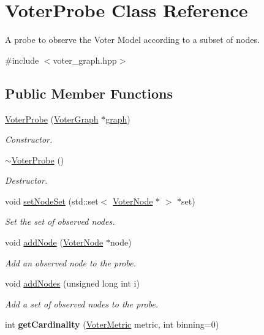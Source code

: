 \hypertarget{class_voter_probe}{\section{Voter\-Probe Class Reference}
\label{class_voter_probe}
}


A probe to observe the Voter Model according to a subset of nodes.  




{\ttfamily \#include $<$voter\-\_\-graph.\-hpp$>$}

\subsection*{Public Member Functions}
\begin{DoxyCompactItemize}
\item 
\hyperlink{class_voter_probe_a589eba6cb211385f334b2cad33c7b591}{Voter\-Probe} (\hyperlink{class_voter_graph}{Voter\-Graph} $\ast$\hyperlink{class_voter_probe_add099ac2ac20a5f6a0e3616e78639497}{graph})
\begin{DoxyCompactList}\small\item\em Constructor. \end{DoxyCompactList}\item 
\hypertarget{class_voter_probe_a13ddd0051f730aa8c5b4c1487ace3e16}{\hyperlink{class_voter_probe_a13ddd0051f730aa8c5b4c1487ace3e16}{$\sim$\-Voter\-Probe} ()}\label{class_voter_probe_a13ddd0051f730aa8c5b4c1487ace3e16}

\begin{DoxyCompactList}\small\item\em Destructor. \end{DoxyCompactList}\item 
void \hyperlink{class_voter_probe_a8d30841b343e791216084d6dd0f0f461}{set\-Node\-Set} (std\-::set$<$ \hyperlink{class_voter_node}{Voter\-Node} $\ast$ $>$ $\ast$set)
\begin{DoxyCompactList}\small\item\em Set the set of observed nodes. \end{DoxyCompactList}\item 
void \hyperlink{class_voter_probe_a102e61e3d43b00622f56e746b50aadcb}{add\-Node} (\hyperlink{class_voter_node}{Voter\-Node} $\ast$node)
\begin{DoxyCompactList}\small\item\em Add an observed node to the probe. \end{DoxyCompactList}\item 
void \hyperlink{class_voter_probe_a3833f42ffe18c150a127b2c98ff742fe}{add\-Nodes} (unsigned long int i)
\begin{DoxyCompactList}\small\item\em Add a set of observed nodes to the probe. \end{DoxyCompactList}\item 
\hypertarget{class_voter_probe_abea87d52f082036e8dd854d11bbc524b}{int {\bfseries get\-Cardinality} (\hyperlink{voter__graph_8hpp_acb4c45a5ce4a55eee28e54e60409b9c5}{Voter\-Metric} metric, int binning=0)}\label{class_voter_probe_abea87d52f082036e8dd854d11bbc524b}


\end{DoxyCompactItemize}
